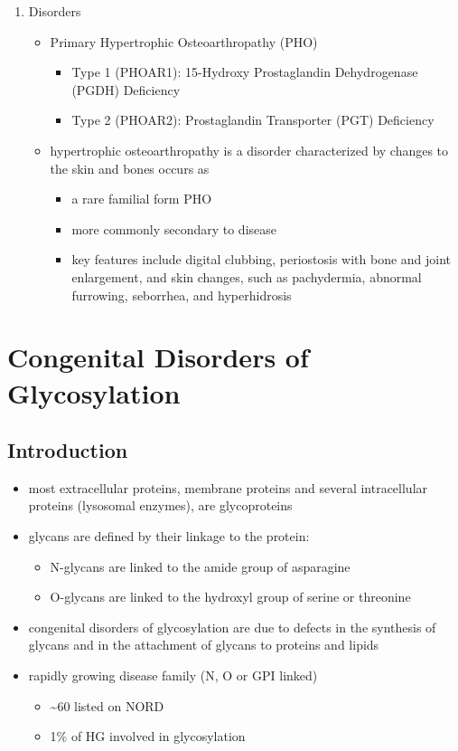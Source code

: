 \documentclass{scrartcl}
\begin{document}
\begin{enumerate}
\item Disorders
\label{sec:orgab968c4}
\begin{itemize}
\item Primary Hypertrophic Osteoarthropathy (PHO)
\begin{itemize}
\item Type 1 (PHOAR1): 15-Hydroxy Prostaglandin Dehydrogenase (PGDH) Deficiency
\item Type 2 (PHOAR2): Prostaglandin Transporter (PGT) Deficiency
\end{itemize}

\item hypertrophic osteoarthropathy is a disorder characterized by changes
to the skin and bones occurs as
\begin{itemize}
\item a rare familial form PHO
\item more commonly secondary to disease
\item key features include digital clubbing, periostosis with bone and
joint enlargement, and skin changes, such as pachydermia, abnormal
furrowing, seborrhea, and hyperhidrosis
\end{itemize}
\end{itemize}
\end{enumerate}
\section{Congenital Disorders of Glycosylation}
\label{sec:org02e7abd}
\subsection{Introduction}
\label{sec:orgc5b14c7}
\begin{itemize}
\item most extracellular proteins, membrane proteins and several
intracellular proteins (lysosomal enzymes), are glycoproteins

\item glycans are defined by their linkage to the protein:
\begin{itemize}
\item N-glycans are linked to the amide group of asparagine
\item O-glycans are linked to the hydroxyl group of serine or
threonine
\end{itemize}

\item congenital disorders of glycosylation are due to defects in the
synthesis of glycans and in the attachment of glycans to proteins
and lipids
\item rapidly growing disease family (N, O or GPI linked)
\begin{itemize}
\item \textasciitilde{}60 listed on NORD
\item 1\% of HG involved in glycosylation
\end{itemize}
\end{itemize}
\end{document}
